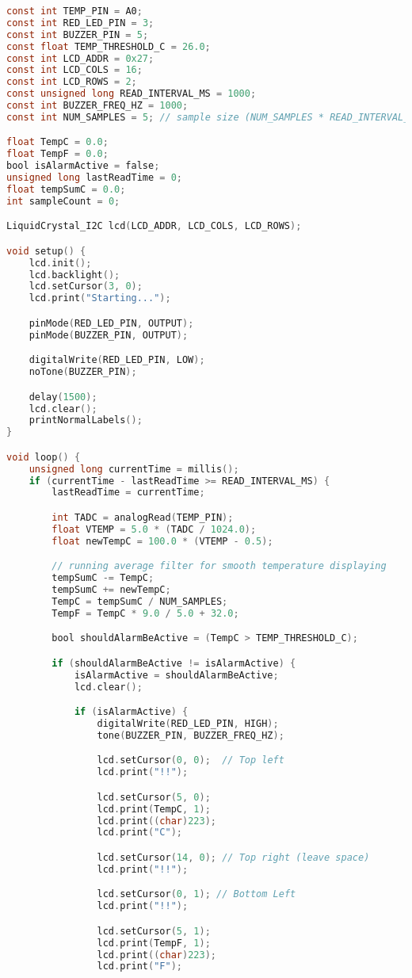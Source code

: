 \documentclass[10pt]{article}
\begin{document}
\begin{enumerate}[label=\Alph*.]
\begin{lstlisting}[language=C, caption={Arduino sketch for running average temperature monitoring}]
const int TEMP_PIN = A0;
const int RED_LED_PIN = 3;
const int BUZZER_PIN = 5;
const float TEMP_THRESHOLD_C = 26.0;
const int LCD_ADDR = 0x27;
const int LCD_COLS = 16;
const int LCD_ROWS = 2;
const unsigned long READ_INTERVAL_MS = 1000;
const int BUZZER_FREQ_HZ = 1000;
const int NUM_SAMPLES = 5; // sample size (NUM_SAMPLES * READ_INTERVAL_MS) is 5s

float TempC = 0.0;
float TempF = 0.0;
bool isAlarmActive = false;
unsigned long lastReadTime = 0;
float tempSumC = 0.0;
int sampleCount = 0;

LiquidCrystal_I2C lcd(LCD_ADDR, LCD_COLS, LCD_ROWS);

void setup() {
	lcd.init();
	lcd.backlight();
	lcd.setCursor(3, 0);
	lcd.print("Starting...");

	pinMode(RED_LED_PIN, OUTPUT);
	pinMode(BUZZER_PIN, OUTPUT);

	digitalWrite(RED_LED_PIN, LOW);
	noTone(BUZZER_PIN);

	delay(1500);
	lcd.clear();
	printNormalLabels();
}

void loop() {
	unsigned long currentTime = millis();
	if (currentTime - lastReadTime >= READ_INTERVAL_MS) {
		lastReadTime = currentTime;

		int TADC = analogRead(TEMP_PIN);
		float VTEMP = 5.0 * (TADC / 1024.0);
		float newTempC = 100.0 * (VTEMP - 0.5);

		// running average filter for smooth temperature displaying
		tempSumC -= TempC;
		tempSumC += newTempC;
		TempC = tempSumC / NUM_SAMPLES;
		TempF = TempC * 9.0 / 5.0 + 32.0;

		bool shouldAlarmBeActive = (TempC > TEMP_THRESHOLD_C);

		if (shouldAlarmBeActive != isAlarmActive) {
			isAlarmActive = shouldAlarmBeActive;
			lcd.clear();

			if (isAlarmActive) {
				digitalWrite(RED_LED_PIN, HIGH);
				tone(BUZZER_PIN, BUZZER_FREQ_HZ);

				lcd.setCursor(0, 0);  // Top left
				lcd.print("!!");

				lcd.setCursor(5, 0);
				lcd.print(TempC, 1);
				lcd.print((char)223);
				lcd.print("C");

				lcd.setCursor(14, 0); // Top right (leave space)
				lcd.print("!!");

				lcd.setCursor(0, 1); // Bottom Left
				lcd.print("!!");

				lcd.setCursor(5, 1);
				lcd.print(TempF, 1);
				lcd.print((char)223);
				lcd.print("F");


\end{lstlisting}
\end{enumerate}
\end{document}
